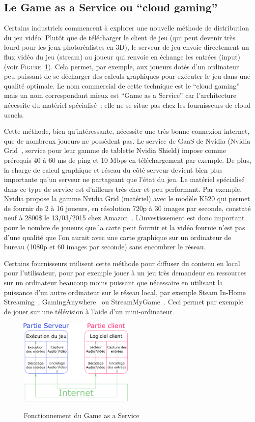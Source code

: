 \subsection{Le Game as a Service ou ``cloud gaming''}
Certains industriels commencent à explorer une nouvelle méthode de distribution du jeu vidéo.
Plutôt que de télécharger le client de jeu (qui peut devenir très lourd pour les jeux photoréalistes en 3D), le serveur de jeu envoie directement un flux vidéo du jeu (stream) au joueur qui renvoie en échange les entrées (input) (voir \textsc{Figure}~\ref{fig:gaas}).
Cela permet, par exemple, aux joueurs dotés d'un ordinateur peu puissant de se décharger des calculs graphiques pour exécuter le jeu dans une qualité optimale.
Le nom commercial de cette technique est le ``cloud gaming'' mais un nom correspondant mieux est ``Game as a Service'' car l'architecture nécessite du matériel spécialisé~: elle ne se situe pas chez les fournisseurs de cloud usuels.

Cette méthode, bien qu'intéressante, nécessite une très bonne connexion internet, que de nombreux joueurs ne possèdent pas.
Le service de GaaS de Nvidia (Nvidia Grid~\cite{grid}, service pour leur gamme de tablette Nvidia Shield) impose comme prérequis 40 à 60 ms de ping et 10 Mbps en téléchargement par exemple.
De plus, la charge de calcul graphique et réseau du côté serveur devient bien plus importante qu'un serveur ne partageant que l'état du jeu.
Le matériel spécialisé dans ce type de service est d'ailleurs très cher et peu performant.
Par exemple, Nvidia propose la gamme Nvidia Grid (matériel) avec le modèle K520 qui permet de fournir de 2 à 16 joueurs, en résolution 720p à 30 images par seconde, constaté neuf à 2800\$ le 13/03/2015 chez Amazon~\cite{grid_k520}.
L'investissement est donc important pour le nombre de joueurs que la carte peut fournir et la vidéo fournie n'est pas d'une qualité que l'on aurait avec une carte graphique sur un ordinateur de bureau (1080p et 60 images par seconde) sans encombrer le réseau.

Certains fournisseurs utilisent cette méthode pour diffuser du contenu en local pour l'utilisateur, pour par exemple jouer à un jeu très demandeur en ressources sur un ordinateur beaucoup moins puissant que nécessaire en utilisant la puissance d'un autre ordinateur sur le réseau local, par exemple Steam In-Home Streaming~\cite{steam_inhome}, GamingAnywhere~\cite{gaminganywhere_article} ou StreamMyGame~\cite{streammygame}.
Ceci permet par exemple de jouer sur une télévision à l'aide d'un mini-ordinateur.

\begin{figure}[t!]
	\centering
	\includegraphics[width=0.5\textwidth]{gaas.png}
	\\[0.2cm]
	\caption{Fonctionnement du Game as a Service}
	\label{fig:gaas}
\end{figure}
